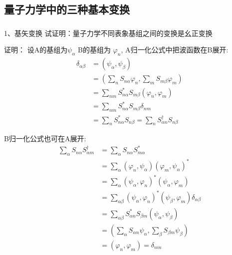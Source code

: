\subsection{量子力学中的三种基本变换}

\begin{frame} 
    \frametitle{}
    \begin{tcolorbox1}{1、基矢变换}
        试证明：量子力学不同表象基组之间的变换是幺正变换  
    \end{tcolorbox1}
    \alert{证明：} 设A的基组为$\psi_\alpha$ B的基组为 $\varphi_n$, A归一化公式中把波函数在B展开: 
    \begin{equation*}
        \begin{split}
            \delta_{\alpha\beta} &= (\psi_\alpha, \psi_\beta) \\
            &= (\sum_n S_{n\alpha} \varphi_n, \sum_m S_{m\beta} \varphi_m)\\
            &= \sum_{nm} S_{n\alpha} ^* S_{m\beta}(\varphi_n, \varphi_m)\\
            &= \sum_{nm} S_{n\alpha} ^* S_{m\beta}\delta_{nm}\\
            &= \sum_{n} S_{n\alpha} ^* S_{n\beta} = \sum_{n} S^{\dagger } _{\alpha n} S_{n\beta}
        \end{split} 
    \end{equation*}
\end{frame}

\begin{frame} 
    B归一化公式也可在A展开: 
    \begin{equation*}
        \begin{split}
            \sum_{\alpha} S_{n\alpha}  S^{\dagger } _{\alpha m}&=\sum_{\alpha} S_{n\alpha}  S_{m \alpha} ^* \\
            &=\sum_{\alpha} (\varphi_n, \psi_\alpha) (\varphi_m, \psi_\alpha)^* \\
            &=\sum_{\alpha} (\psi_\alpha,\varphi_n)^* (\psi_\alpha,\varphi_m) \\
            &=\sum_{\alpha\beta} (\psi_\alpha,\varphi_n)^* (\psi_\beta,\varphi_m) \delta_{\alpha\beta} \\
            &=\sum_{\alpha\beta} S_{\alpha n}^*  S_{\beta m} (\psi_\alpha,\psi_\beta)\\
            &= (\sum_{\alpha} S_{\alpha n}\psi_\alpha,\sum_{\beta} S_{\beta m}\psi_\beta)\\
            &= (\varphi_n,\varphi_m) =\delta_{nm} 
        \end{split} 
    \end{equation*}
\end{frame}

